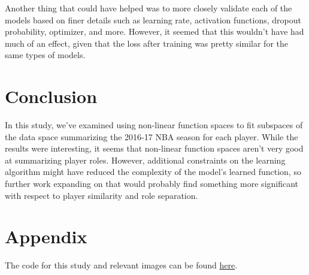 \documentclass[12pt]{article}
\begin{document}
    Another thing that could have helped was to more closely validate each of the models based on finer details such as learning rate, activation functions, dropout probability, optimizer, and more. However, it seemed that this wouldn't have had much of an effect, given that the loss after training was pretty similar for the same types of models.
    \section{Conclusion}
    In this study, we've examined using non-linear function spaces to fit subspaces of the data space summarizing the 2016-17 NBA season for each player. While the results were interesting, it seems that non-linear function spaces aren't very good at summarizing player roles. However, additional constraints on the learning algorithm might have reduced the complexity of the model's learned function, so further work expanding on that would probably find something more significant with respect to player similarity and role separation.
    \section{Appendix}
    The code for this study and relevant images can be found \href{https://github.com/dthiagarajan/4701_project}{here}.
    
\end{document}
